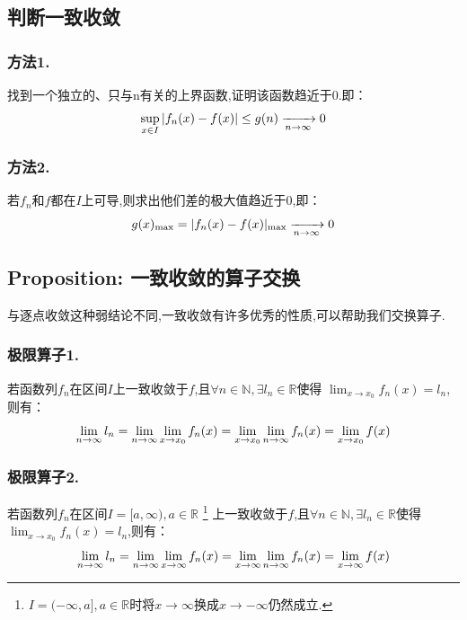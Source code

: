 \documentclass[12pt, a4paper, oneside]{ctexbook}
\newcommand{\R }{\mathbb{R}}%
\begin{document}
  \subsection{判断一致收敛}
  \subsubsection{方法1.}
  找到一个独立的、只与n有关的上界函数,证明该函数趋近于0.即：
  \begin{equation}
    \notag
    \sup_{x\in I}| f_n(x)-f(x)|\leq g(n)\xrightarrow[n\rightarrow\infty]{}0   
  \end{equation}
  \subsubsection{方法2.}
  若$f_n$和$f$都在$I$上可导,则求出他们差的极大值趋近于0,即：
  \begin{equation}
    \notag
    g(x)_{\max}=|f_n(x)-f(x)|_{\max}\xrightarrow[n\rightarrow\infty]{}0   
  \end{equation}
  \subsection{Proposition: 一致收敛的算子交换}
  与逐点收敛这种弱结论不同,一致收敛有许多优秀的性质,可以帮助我们交换算子.
  \subsubsection{极限算子1.}
  若函数列$f_n$在区间$I$上一致收敛于$f$,且$\forall n\in\mathbb{N}, \exists l_n\in\R$使得
  $\lim_{x \to x_0}f_n(x)=l_n$,则有：
  \begin{equation}
    \notag
    \lim_{n \to \infty}l_n= \lim_{n \to \infty}\lim_{x \to x_0}f_n(x)
    =\lim_{x \to x_0}\lim_{n \to \infty}f_n(x)=\lim_{x \to x_0}f(x)   
  \end{equation}
  \subsubsection{极限算子2.}
  若函数列$f_n$在区间$I=[a,\infty), a\in\R$
    \footnote{$I=(-\infty,a], a\in\R$时将$x \to \infty$换成$x \to -\infty$仍然成立.}
  上一致收敛于$f$,且$\forall n\in\mathbb{N}, \exists l_n\in\R$使得
  $\lim_{x \to x_0}f_n(x)=l_n$,则有：
  \begin{equation}
    \notag
    \lim_{n \to \infty}l_n= \lim_{n \to \infty}\lim_{x \to \infty}f_n(x)
    =\lim_{x \to \infty}\lim_{n \to \infty}f_n(x)=\lim_{x \to \infty}f(x)   
  \end{equation}
\end{document}
